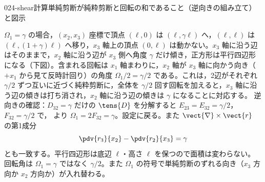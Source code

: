 \documentclass[uplatex,dvipdfmx,a4paper,11pt]{jsarticle}
\begin{document}
\begin{mondai}{024-shear}{計算}{単純剪断が純粋剪断と回転の和であること（逆向きの組み立て）と図示}
\begin{tadashii}
 $\Omega_1=\gamma$ の場合，$(x_2,x_3)$ 座標で頂点 $(\ell,0)$ は $(\ell,\gamma\ell)$ へ，$(\ell,\ell)$ は $(\ell,(1+\gamma)\ell)$ へ移り，$x_3$ 軸上の頂点 $(0,\ell)$ は動かない。$x_3$ 軸に沿う辺はそのままで，$x_2$ 軸に沿う辺が $x_3$ 側へ角度 $\gamma$ だけ傾き，正方形は平行四辺形になる（下図）。含まれる回転は $x_1$ 軸まわりに，$x_2$ 軸が $x_3$ 軸に向かう向き（$+x_1$ から見て反時計回り）の角度 $\Omega_1/2=\gamma/2$ である。これは，2辺がそれぞれ $\gamma/2$ ずつ互いに近づく純粋剪断に，全体を $\gamma/2$ 回す回転を加えると，$x_3$ 軸に沿う辺の傾きは打ち消され，$x_2$ 軸に沿う辺の傾きは $\gamma$ になることに対応する。
\kenzan 逆向きの確認：$D_{32}=\gamma$ だけの $\tens{D}$ を分解すると $E_{23}=E_{32}=\gamma/2$，$F_{32}=\gamma/2$ で， より $\Omega_1=2F_{32}=\gamma$。設定に戻る。また $\vect{\nabla}\times\vect{r}$ の第1成分
\[ \pdv{r_3}{x_2}-\pdv{r_2}{x_3}=\gamma \]
とも一致する。平行四辺形は底辺 $\ell$・高さ $\ell$ を保つので面積は変わらない。
\tsumazuki 回転角は $\Omega_1=\gamma$ ではなく $\gamma/2$。また $\Omega_1$ の符号で単純剪断のずれる向き（$x_3$ 方向か $x_2$ 方向か）が入れ替わる。
\end{tadashii}
\end{mondai}

\noteowari
\end{document}

